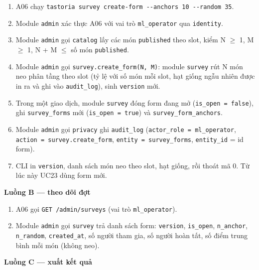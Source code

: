 \begin{enumerate}
\item A06 chạy {\small\texttt{tastoria survey create-\allowbreak{}form -\allowbreak{}-\allowbreak{}anchors 10 -\allowbreak{}-\allowbreak{}random 35}}.
\item Module {\small\texttt{admin}} xác thực A06 với vai trò {\small\texttt{ml\_\allowbreak{}\allowbreak{}operator}} qua {\small\texttt{identity}}.
\item Module {\small\texttt{admin}} gọi {\small\texttt{catalog}} lấy các món {\small\texttt{published}} theo slot, kiểm N \ensuremath{\geq} 1, M \ensuremath{\geq} 1, N + M \ensuremath{\leq} số món {\small\texttt{published}}.
\item Module {\small\texttt{admin}} gọi {\small\texttt{survey.\allowbreak{}create\_\allowbreak{}\allowbreak{}form(N, M)}}: module {\small\texttt{survey}} rút N món neo phân tầng theo slot (tỷ lệ với số món mỗi slot, hạt giống ngẫu nhiên được in ra và ghi vào {\small\texttt{audit\_\allowbreak{}\allowbreak{}log}}), sinh {\small\texttt{version}} mới.
\item Trong một giao dịch, module {\small\texttt{survey}} đóng form đang mở ({\small\texttt{is\_\allowbreak{}\allowbreak{}open = false}}), ghi {\small\texttt{survey\_\allowbreak{}\allowbreak{}forms}} mới ({\small\texttt{is\_\allowbreak{}\allowbreak{}open = true}}) và {\small\texttt{survey\_\allowbreak{}\allowbreak{}form\_\allowbreak{}\allowbreak{}anchors}}.
\item Module {\small\texttt{admin}} gọi {\small\texttt{privacy}} ghi {\small\texttt{audit\_\allowbreak{}\allowbreak{}log}} ({\small\texttt{actor\_\allowbreak{}\allowbreak{}role = ml\_\allowbreak{}\allowbreak{}operator}}, {\small\texttt{action = survey.\allowbreak{}create\_\allowbreak{}\allowbreak{}form}}, {\small\texttt{entity = survey\_\allowbreak{}\allowbreak{}forms}}, {\small\texttt{entity\_\allowbreak{}\allowbreak{}id}} = id form).
\item CLI in {\small\texttt{version}}, danh sách món neo theo slot, hạt giống, rồi thoát mã 0. Từ lúc này UC23 dùng form mới.
\end{enumerate}
\textbf{Luồng B --- theo dõi đợt}

\begin{enumerate}
\item A06 gọi {\small\texttt{GET /\allowbreak{}\allowbreak{}admin/\allowbreak{}\allowbreak{}surveys}} (vai trò {\small\texttt{ml\_\allowbreak{}\allowbreak{}operator}}).
\item Module {\small\texttt{admin}} gọi {\small\texttt{survey}} trả danh sách form: {\small\texttt{version}}, {\small\texttt{is\_\allowbreak{}\allowbreak{}open}}, {\small\texttt{n\_\allowbreak{}\allowbreak{}anchor}}, {\small\texttt{n\_\allowbreak{}\allowbreak{}random}}, {\small\texttt{created\_\allowbreak{}\allowbreak{}at}}, số người tham gia, số người hoàn tất, số điểm trung bình mỗi món (không neo).
\end{enumerate}
\textbf{Luồng C --- xuất kết quả}

